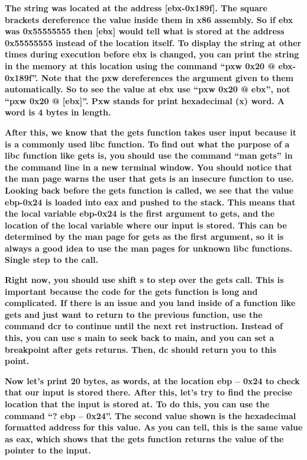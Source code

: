 \documentclass[letterpaper]{article}
\newcommand{\sitfig}[3]{
\begin{figure}[H]
\centering
\makebox[\textwidth][c]{
#2
}
\label{#1}
\end{figure}
}
\newcommand{\sitgfx}[4][scale=1.0]{
\sitfig{#3}{\texttt{[image: \#2]}}{#4}
}
\begin{document}
\textbf{The string was located at the address [ebx-0x189f]. The square brackets dereference the value inside them in x86
assembly. So if ebx was 0x55555555 then [ebx] would tell what is stored at the address 0x55555555 instead of the
location itself. To display the string at other times during execution before ebx is changed, you can print the string
in the memory at this location using the command ``pxw 0x20 @ ebx-0x189f''. Note that the pxw dereferences the argument
given to them automatically. So to see the value at ebx use ``pxw 0x20 @ ebx'', not ``pxw 0x20 @ [ebx]''. Pxw stands
for print hexadecimal (x) word. A word is 4 bytes in length. }

  
\sitgfx[width=6.5in,height=4.0626in]{reversing-img058.png}{fig:unk}{TODO CAPTION}
 

\textbf{After this, we know that the gets function takes user input because it is a commonly used libc function. To find
out what the purpose of a libc function like gets is, you should use the command ``man gets'' in the command line in a
new terminal window. You should notice that the man page warns the user that gets is an insecure function to use.
Looking back before the gets function is called, we see that the value ebp-0x24 is loaded into eax and pushed to the
stack. This means that the local variable ebp-0x24 is the first argument to gets, and the location of the local
variable where our input is stored. This can be determined by the man page for gets as the first argument, so it is
always a good idea to use the man pages for unknown libc functions. Single step to the call.}

  
\sitgfx[width=6.5in,height=4.0626in]{reversing-img059.png}{fig:unk}{TODO CAPTION}
 

  
\sitgfx[width=6.5in,height=4.0626in]{reversing-img060.png}{fig:unk}{TODO CAPTION}
 

\textbf{Right now, you should use shift s to step over the gets call. This is important because the code for the gets
function is long and complicated. If there is an issue and you land inside of a function like gets and just want to
return to the previous function, use the command dcr to continue until the next ret instruction. Instead of this, you
can use s main to seek back to main, and you can set a breakpoint after gets returns. Then, dc should return you to
this point.}

\textbf{Now let's print 20 bytes, as words, at the location ebp -- 0x24 to check that our input is stored there. After
this, let's try to find the precise location that the input is stored at. To do this, you can use the command ``? ebp
-- 0x24''. The second value shown is the hexadecimal formatted address for this value. As you can tell, this is the
same value as eax, which shows that the gets function returns the value of the pointer to the input.}
\end{document}
